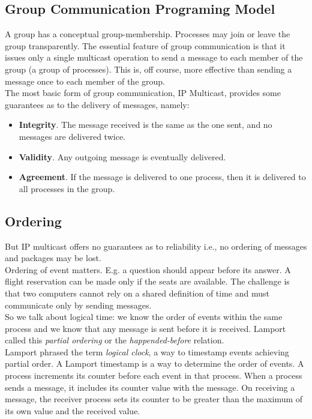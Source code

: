 \subsection{Group Communication Programing Model}

A group has a conceptual group-membership. Processes may join or leave the group transparently. The essential feature of group communication is that it issues only a single multicast operation to send a message to each member of the group (a group of processes). This is, off course, more effective than sending a message once to each member of the group. \\

The most basic form of group communication, IP Multicast, provides some guarantees as to the delivery of messages, namely:\\

\begin{itemize}
\item \textbf{Integrity}. The message received is the same as the one sent, and no messages are delivered twice. 
\item \textbf{Validity}. Any outgoing  message is eventually delivered.
\item \textbf{Agreement}. If the message is delivered to one process, then it is delivered to all processes in the group.
\end{itemize}

\subsection{Ordering}

But IP multicast offers no guarantees as to reliability i.e., no ordering of messages and packages may be lost. \\

Ordering of event matters. E.g. a question should appear before its answer. A flight reservation can be made only if the seats are available. The challenge is that two computers cannot rely on a shared definition of time and must communicate only by sending messages. \\ 

So we talk about logical time: we know the order of events within the same process and we know that any message is sent before it is received. Lamport called this \emph{partial ordering } or the \emph{happended-before} relation.\\

Lamport phrased the term \emph{logical clock}, a way to timestamp events achieving partial order. A Lamport timestamp is a way to determine the order of events. A process increments its counter before each event in that process. When a process sends a message, it includes its counter value with the message. On receiving a message, the receiver process sets its counter to be greater than the maximum of its own value and the received value. 

